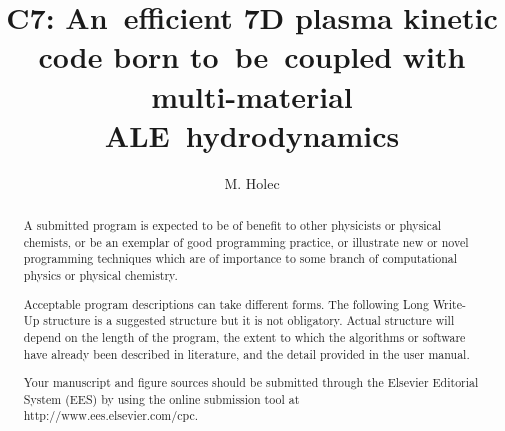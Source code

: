 \documentclass[preprint,12pt]{elsarticle}
\begin{document}
\begin{frontmatter}



\title{C7: An~efficient 7D plasma kinetic code born to~be~coupled with multi-material ALE~hydrodynamics}


\author[a]{M. Holec}

\address[a]{Centre Lasers Intenses et Applications, Universite de Bordeaux-CNRS-CEA, UMR 5107, F-33405 Talence, France}

\begin{abstract}
A submitted program is expected to be of benefit to other physicists or physical chemists, or be an exemplar of good programming practice, or illustrate new or novel programming techniques which are of importance to some branch of computational physics or physical chemistry.

Acceptable program descriptions can take different forms. The following Long Write-Up structure is a suggested structure but it is not obligatory. Actual structure will depend on the length of the program, the extent to which the algorithms or software have already been described in literature, and the detail provided in the user manual.

Your manuscript and figure sources should be submitted through the Elsevier Editorial System (EES) by using the online submission tool at \\
http://www.ees.elsevier.com/cpc.


\end{abstract}
\end{frontmatter}
\end{document}
